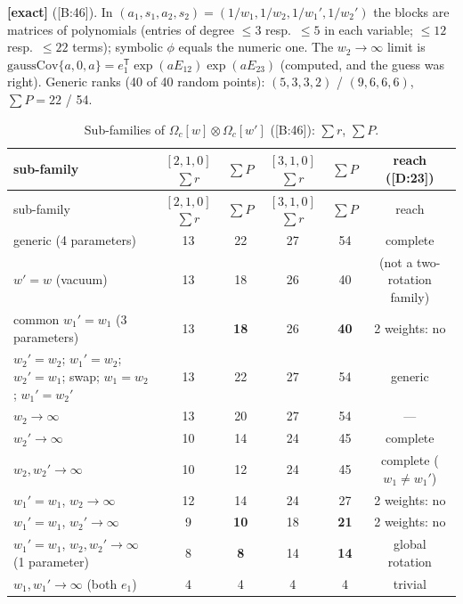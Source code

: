 \documentclass[10pt]{article}
\newcommand{\cl}[2]{\textsf{[#1:#2]}}
\newcommand{\tg}[1]{\textbf{[#1]}}
\newcommand{\Om}{\Omega}
\begin{document}
\tg{exact} (\cl{B}{46}). In $(a_1,s_1,a_2,s_2)=(1/w_1,1/w_2,1/w_1',1/w_2')$ the blocks are matrices of polynomials (entries of degree $\le3$ resp.\ $\le5$ in each variable; $\le12$ resp.\ $\le22$ terms); symbolic $\phi$ equals the numeric one. The $w_2\to\infty$ limit is $\mathrm{gaussCov}\{a,0,a\}=e_1^{\mathsf T}\exp(aE_{12})\exp(aE_{23})$ (computed, and the guess was right). Generic ranks (40 of 40 random points): $(5,3,3,2)$ / $(9,6,6,6)$, $\sum P=22$ / 54.

\begin{center}\small\setlength{\tabcolsep}{4pt}\begin{longtable}{@{}p{5.6cm}ccccc@{}}
\caption{Sub-families of $\Om_c[w]\otimes\Om_c[w']$ (\cl{B}{46}): $\sum r$, $\sum P$.}\label{tab:Bsub}\\\toprule
sub-family & $[2,1,0]$ $\sum r$ & $\sum P$ & $[3,1,0]$ $\sum r$ & $\sum P$ & reach (\cl{D}{23}) \\\midrule\endfirsthead
sub-family & $[2,1,0]$ $\sum r$ & $\sum P$ & $[3,1,0]$ $\sum r$ & $\sum P$ & reach \\\midrule\endhead
generic (4 parameters) & 13 & 22 & 27 & 54 & complete \\
$w'=w$ (vacuum) & 13 & 18 & 26 & 40 & (not a two-rotation family) \\
common $w_1'=w_1$ (3 parameters) & 13 & \textbf{18} & 26 & \textbf{40} & 2 weights: no \\
$w_2'=w_2$; $w_1'=w_2$; $w_2'=w_1$; swap; $w_1=w_2$; $w_1'=w_2'$ & 13 & 22 & 27 & 54 & generic \\
$w_2\to\infty$ & 13 & 20 & 27 & 54 & --- \\
$w_2'\to\infty$ & 10 & 14 & 24 & 45 & complete \\
$w_2,w_2'\to\infty$ & 10 & 12 & 24 & 45 & complete ($w_1\neq w_1'$) \\
$w_1'=w_1$, $w_2\to\infty$ & 12 & 14 & 24 & 27 & 2 weights: no \\
$w_1'=w_1$, $w_2'\to\infty$ & 9 & \textbf{10} & 18 & \textbf{21} & 2 weights: no \\
$w_1'=w_1$, $w_2,w_2'\to\infty$ (1 parameter) & 8 & \textbf{8} & 14 & \textbf{14} & global rotation \\
$w_1,w_1'\to\infty$ (both $e_1$) & 4 & 4 & 4 & 4 & trivial \\
\bottomrule
\end{longtable}\end{center}
\end{document}
